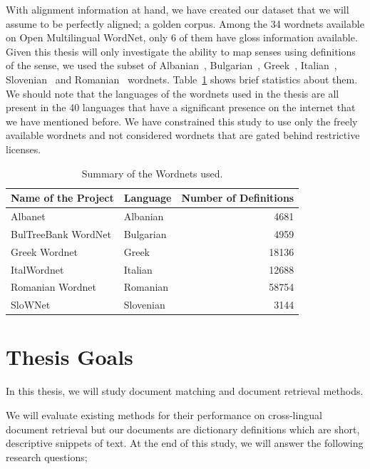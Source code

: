 With alignment information at hand, we have created our dataset that we will assume to be perfectly aligned; a golden corpus.
Among the 34 wordnets available on Open Multilingual WordNet, only 6 of them have gloss information available.
Given this thesis will only investigate the ability to map senses using definitions of the sense, we used the subset of Albanian~\cite{ruci_current_2008}, Bulgarian~\cite{simov_constructing_2010}, Greek~\cite{stamou_exploring_2004}, Italian~\cite{pianta_multiwordnet_2002}, Slovenian~\cite{fiser_slownet_2012} and Romanian~\cite{tufis_romanian_2008} wordnets.
Table~\ref{tab:summary_table} shows brief statistics about them.
We should note that the languages of the wordnets used in the thesis are all present in the 40 languages that have a significant presence on the internet that we have mentioned before.
We have constrained this study to use only the freely available wordnets and not considered wordnets that are gated behind restrictive licenses.
\begin{table}[htbp]
    \centering
    \begin{tabular}{llr}
        \toprule%
        \textbf{Name of the Project} & \textbf{Language} & \textbf{Number of Definitions} \\
        \midrule%
        Albanet & Albanian & 4681 \\
        BulTreeBank WordNet & Bulgarian & 4959 \\
        Greek Wordnet & Greek & 18136 \\
        ItalWordnet & Italian & 12688 \\
        Romanian Wordnet & Romanian & 58754 \\
        SloWNet & Slovenian & 3144 \\
        \bottomrule %
    \end{tabular}
    \caption{Summary of the Wordnets used.}%
    \label{tab:summary_table}%
\end{table}

\section{Thesis Goals}%
\label{sec:thesis_goals}

In this thesis, we will study document matching and document retrieval methods.

We will evaluate existing methods for their performance on cross-lingual document retrieval but our documents are dictionary definitions which are short, descriptive snippets of text.
At the end of this study, we will answer the following research questions;

